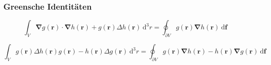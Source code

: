 \documentclass[titlepage,11pt,a4paper,ngerman]{report}
\renewcommand{\vec}[1]{\boldsymbol{#1}}
\newcommand{\vabla}{\boldsymbol{\nabla}}
\renewcommand{\paragraph}[1]{\subsubsection{#1}}
\begin{document}
\paragraph{Greensche Identitäten}

$$\int_{V} \vabla g(\vec{r}) \cdot \vabla h(\vec{r}) + g(\vec{r})\Delta h(\vec{r})\ \mathrm{d}^{3}r = \oint_{\partial V} g(\vec{r}) \vabla h(\vec{r})\ \mathrm{d}\vec{f}$$

$$\int_{V} g(\vec{r}) \Delta h(\vec{r}) g(\vec{r}) - h(\vec{r}) \Delta g(\vec{r})\ \mathrm{d}^{3}r = \oint_{\partial V}g(\vec{r})\vabla h(\vec{r}) - h(\vec{r}) \vabla g(\vec{r})\ \mathrm{d}\vec{f}$$
\end{document}
